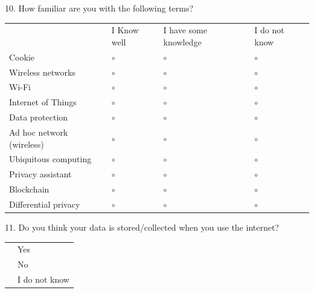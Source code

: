 10. How familiar are you with the following terms?

\vspace{0.6cm}
\begin{center}
    \noindent\begin{tabular}{ p{4.5cm} p{3cm} p{4cm} p{3cm} }
        & I Know well & I have some knowledge & I do not know \\[0.4cm]
        Cookie & {\huge $\circ$} & {\huge $\circ$} & {\huge $\circ$} \\[0.2cm]
        Wireless networks & {\huge $\circ$} & {\huge $\circ$} & {\huge $\circ$} \\[0.2cm]
        Wi-Fi & {\huge $\circ$} & {\huge $\circ$} & {\huge $\circ$} \\[0.2cm]
        Internet of Things & {\huge $\circ$} & {\huge $\circ$} & {\huge $\circ$} \\[0.2cm]
        Data protection & {\huge $\circ$} & {\huge $\circ$} & {\huge $\circ$} \\[0.2cm]
        Ad hoc network (wireless) & {\huge $\circ$} & {\huge $\circ$} & {\huge $\circ$} \\[0.2cm]
        Ubiquitous computing & {\huge $\circ$} & {\huge $\circ$} & {\huge $\circ$} \\[0.2cm]
        Privacy assistant & {\huge $\circ$} & {\huge $\circ$} & {\huge $\circ$} \\[0.2cm]
        Blockchain & {\huge $\circ$} & {\huge $\circ$} & {\huge $\circ$} \\[0.2cm]
        Differential privacy & {\huge $\circ$} & {\huge $\circ$} & {\huge $\circ$}
    \end{tabular}
\end{center}
\vspace{0.6cm}

11. Do you think your data is stored/collected when you use the internet?

\vspace{0.6cm}
\begin{center}
    \noindent\begin{tabularx}{0.8\textwidth}{ >{\centering\arraybackslash}X >{\raggedright\arraybackslash}X }
        {\huge $\circ$} & Yes \\[0.2cm]
        {\huge $\circ$} & No \\[0.2cm]
        {\huge $\circ$} & I do not know
    \end{tabularx}
\end{center}
\vspace{0.6cm}

